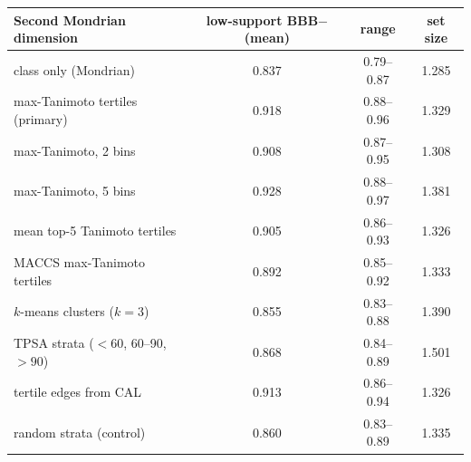 \begin{tabular}{lccc}
\toprule
Second Mondrian dimension & low-support BBB$-$ (mean) & range & set size\\
\midrule
class only (Mondrian) & 0.837 & 0.79--0.87 & 1.285\\
max-Tanimoto tertiles (primary) & 0.918 & 0.88--0.96 & 1.329\\
max-Tanimoto, 2 bins & 0.908 & 0.87--0.95 & 1.308\\
max-Tanimoto, 5 bins & 0.928 & 0.88--0.97 & 1.381\\
mean top-5 Tanimoto tertiles & 0.905 & 0.86--0.93 & 1.326\\
MACCS max-Tanimoto tertiles & 0.892 & 0.85--0.92 & 1.333\\
$k$-means clusters ($k=3$) & 0.855 & 0.83--0.88 & 1.390\\
TPSA strata ($<60$, 60--90, $>90$) & 0.868 & 0.84--0.89 & 1.501\\
tertile edges from CAL & 0.913 & 0.86--0.94 & 1.326\\
random strata (control) & 0.860 & 0.83--0.89 & 1.335\\
\bottomrule
\end{tabular}
